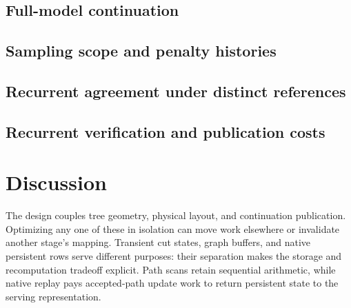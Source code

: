 \documentclass[conference]{IEEEtran}
\begin{document}
\subsection{Full-model continuation}
\label{sec:fullmodel-validation}


\subsection{Sampling scope and penalty histories}
\label{sec:sampling-validation}


\subsection{Recurrent agreement under distinct references}
\label{sec:m1-qualification}


\subsection{Recurrent verification and publication costs}
\label{sec:mechanism-costs}


\section{Discussion}
\label{sec:discussion}
The design couples tree geometry, physical layout, and continuation publication. Optimizing any one of these in isolation can move work elsewhere or invalidate another stage's mapping. Transient cut states, graph buffers, and native persistent rows serve different purposes: their separation makes the storage and recomputation tradeoff explicit. Path scans retain sequential arithmetic, while native replay pays accepted-path update work to return persistent state to the serving representation.
\end{document}
